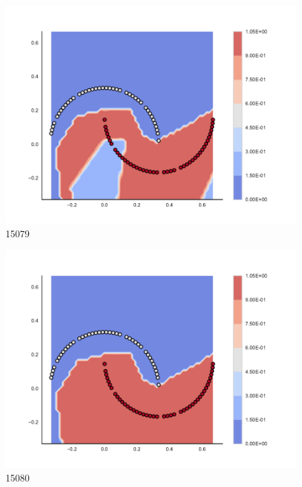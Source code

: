 \begin{subfigure}[b]{0.09\textwidth}
    \includegraphics[clip, trim=2.35cm 1.75cm 4.5cm 0cm,width=\textwidth]{img/convergence/15079.pdf}
    \caption{15079}
    \label{fig:convergence_15079}
\end{subfigure}
%
\begin{subfigure}[b]{0.09\textwidth}
    \includegraphics[clip, trim=2.35cm 1.75cm 4.5cm 0cm,width=\textwidth]{img/convergence/15080.pdf}
    \caption{15080}
    \label{fig:convergence_15080}
\end{subfigure}
%
